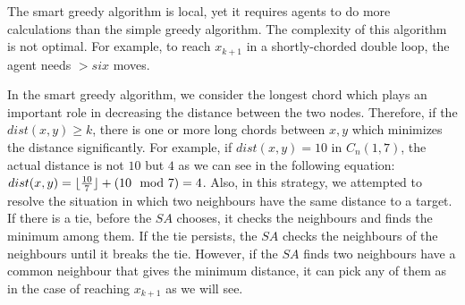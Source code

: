 \begin{center}
\end{center}

The smart greedy algorithm is local, yet it requires agents to do more calculations than the simple greedy algorithm. The complexity of this algorithm is not optimal. For example, to reach $x_{k+1}$ in a shortly-chorded double loop, the agent needs $>six$ moves.

In the smart greedy algorithm, we consider the longest chord which plays an important role in decreasing the distance between the two nodes. Therefore, if the $dist(x,y)\ge k$, there is one or more long chords between $x,y$ which minimizes the distance significantly. For example, if $dist(x,y)=10$ in $C_n(1,7)$, the actual distance is not $10$ but $4$ as we can see in the following equation:
$dist(x,y)= \lfloor{10 \over 7}\rfloor + (10 \mod 7) =4$.
Also, in this strategy, we attempted to resolve the situation in which two neighbours have the same distance to a target. If there is a tie, before the $SA$ chooses, it checks the neighbours and finds the minimum among them. If the tie persists, the $SA$ checks the neighbours of the neighbours until it breaks the tie. However, if the $SA$ finds two neighbours have a common neighbour that gives the minimum distance, it can pick any of them as in the case of reaching $x_{k+1}$ as we will see.


